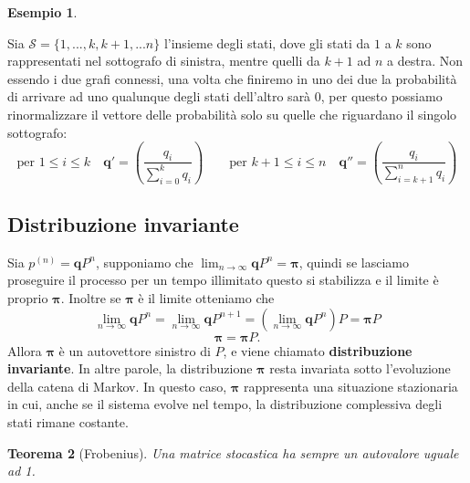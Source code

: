 \documentclass{article}
\newtheorem{theorem}{Teorema}[section]
\theoremstyle{definition}
\newtheorem{example}[theorem]{Esempio}
\theoremstyle{remark}
\begin{document}
\begin{example}
\begin{center}

    \end{center}
    Sia $\mathcal{S}=\{1,...,k,k+1,...n\}$
    l'insieme degli stati, dove gli stati da $1$ a $k$ sono rappresentati nel sottografo di sinistra, mentre quelli da $k+1$ ad $n$ a destra.
    Non essendo  i due grafi connessi, una volta che finiremo in uno dei due la probabilità di arrivare ad uno
    qualunque degli stati dell'altro sarà $0$, per questo possiamo rinormalizzare il vettore delle probabilità solo su quelle che riguardano il singolo
    sottografo:
    $$\text{per $1\le i\le k$}\quad \mathbf{q'}=\left(\frac{q_i}{\sum_{i=0}^k q_i}\right) \qquad \text{per $k+1\le i\le n$}\quad \mathbf{q''}=\left(\frac{q_i}{\sum_{i=k+1}^n q_i}\right)$$
\end{example}
\subsection{Distribuzione invariante}
Sia $p^{(n)} = \boldsymbol{q}P^n$, supponiamo che $\lim_{n\to\infty}\boldsymbol{q}P^n = \boldsymbol{\pi} $, quindi se lasciamo proseguire il processo
per un tempo illimitato questo si stabilizza e il limite è proprio $\boldsymbol{\pi}$. Inoltre se $\boldsymbol{\pi}$ è il limite otteniamo che
$$\lim_{n\to \infty} \boldsymbol{q}P^n = \lim_{n\to \infty} \boldsymbol{q}P^{n+1} = (\lim_{n\to \infty} \boldsymbol{q}P^n)P = \boldsymbol{\pi} P$$
$$\boldsymbol{\pi}=\boldsymbol{\pi} P.$$
Allora $\boldsymbol{\pi}$ è un autovettore sinistro di $P$, e viene chiamato \textbf{distribuzione invariante}. In altre parole,
la distribuzione $\boldsymbol{\pi}$ resta invariata sotto l'evoluzione della catena di Markov. In questo caso, $\boldsymbol{\pi}$ rappresenta una situazione stazionaria in cui, anche se il sistema evolve nel tempo,
la distribuzione complessiva degli stati rimane costante.
\begin{theorem}[Frobenius]
    Una matrice \textit{stocastica} ha sempre un autovalore uguale ad 1.
\end{theorem}
\end{document}

